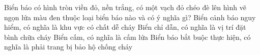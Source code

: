 \begin{ex}
Biển báo có hình tròn viền đỏ, nền trắng, có một vạch đỏ chéo đè lên hình vẽ ngọn lửa màu đen thuộc loại biển báo nào và có ý nghĩa gì?
\choice
{Biển cảnh báo nguy hiểm, có nghĩa là khu vực có chất dễ cháy}
{Biển chỉ dẫn, có nghĩa là vị trí đặt bình chữa cháy}
{\True Biển cấm, có nghĩa là cấm lửa}
{Biển báo bắt buộc thực hiện, có nghĩa là phải trang bị bảo hộ chống cháy}
\end{ex}

